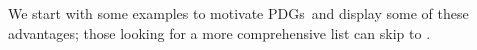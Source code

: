 \documentclass{article}
\newcommand{\MN}{PDG}
\newcommand{\MNs}{\MN s}
\numberwithin{equation}{section}
\begin{document}
%
	We start with some examples to motivate \MNs\ and display some of these advantages; those looking for a more comprehensive list can skip to .
	
\end{document}
